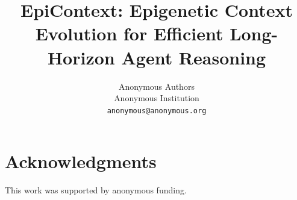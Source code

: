 \documentclass{article}
\title{\textbf{EpiContext: Epigenetic Context Evolution for Efficient Long-Horizon Agent Reasoning}}
\author{Anonymous Authors \\
Anonymous Institution \\
\texttt{anonymous@anonymous.org}}
\begin{document}
\ifcolmsubmission
\linenumbers
\fi

\maketitle

\begin{abstract}

\end{abstract}







\section*{Acknowledgments}
This work was supported by anonymous funding.




\appendix

\end{document}

